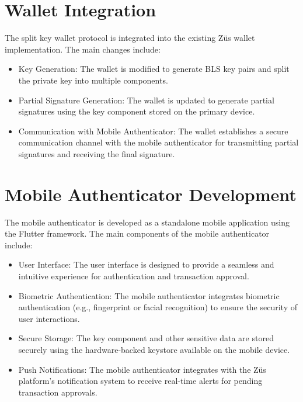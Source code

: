 \section{Wallet Integration}
The split key wallet protocol is integrated into the existing Züs wallet implementation. The main changes include:
\begin{itemize}
    \item Key Generation: The wallet is modified to generate BLS key pairs and split the private key into multiple components.
    \item Partial Signature Generation: The wallet is updated to generate partial signatures using the key component stored on the primary device.
    \item Communication with Mobile Authenticator: The wallet establishes a secure communication channel with the mobile authenticator for transmitting partial signatures and receiving the final signature.
\end{itemize}

\section{Mobile Authenticator Development}
The mobile authenticator is developed as a standalone mobile application using the Flutter framework. The main components of the mobile authenticator include:
\begin{itemize}
    \item User Interface: The user interface is designed to provide a seamless and intuitive experience for authentication and transaction approval.
    \item Biometric Authentication: The mobile authenticator integrates biometric authentication (e.g., fingerprint or facial recognition) to ensure the security of user interactions.
    \item Secure Storage: The key component and other sensitive data are stored securely using the hardware-backed keystore available on the mobile device.
    \item Push Notifications: The mobile authenticator integrates with the Züs platform's notification system to receive real-time alerts for pending transaction approvals.
\end{itemize}

